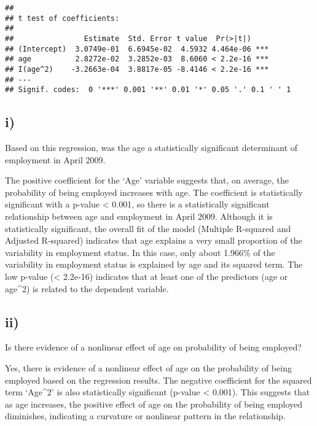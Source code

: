\documentclass[
]{article}
\begin{document}
\begin{verbatim}
## 
## t test of coefficients:
## 
##                Estimate  Std. Error t value  Pr(>|t|)    
## (Intercept)  3.0749e-01  6.6945e-02  4.5932 4.464e-06 ***
## age          2.8272e-02  3.2852e-03  8.6060 < 2.2e-16 ***
## I(age^2)    -3.2663e-04  3.8817e-05 -8.4146 < 2.2e-16 ***
## ---
## Signif. codes:  0 '***' 0.001 '**' 0.01 '*' 0.05 '.' 0.1 ' ' 1
\end{verbatim}

\hypertarget{i}{%
\subsection{i)}\label{i}}

Based on this regression, was the age a statistically significant
determinant of employment in April 2009. \vspace{1em}

The positive coefficient for the `Age' variable suggests that, on
average, the probability of being employed increases with age. The
coefficient is statistically significant with a p-value \textless{}
0.001, so there is a statistically significant relationship between age
and employment in April 2009. Although it is statistically significant,
the overall fit of the model (Multiple R-squared and Adjusted R-squared)
indicates that age explains a very small proportion of the variability
in employment status. In this case, only about 1.966\% of the
variability in employment status is explained by age and its squared
term. The low p-value (\textless{} 2.2e-16) indicates that at least one
of the predictors (age or age\^{}2) is related to the dependent
variable.

\hypertarget{ii}{%
\subsection{ii)}\label{ii}}

Is there evidence of a nonlinear effect of age on probability of being
employed? \vspace{1em}

Yes, there is evidence of a nonlinear effect of age on the probability
of being employed based on the regression results. The negative
coefficient for the squared term `Age\^{}2' is also statistically
significant (p-value \textless{} 0.001). This suggests that as age
increases, the positive effect of age on the probability of being
employed diminishes, indicating a curvature or nonlinear pattern in the
relationship.
\end{document}
